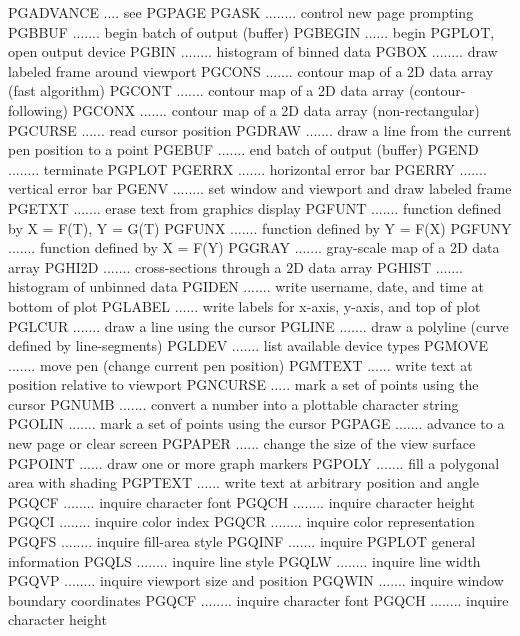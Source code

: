 {\eightpoint\begintt
PGADVANCE .... see PGPAGE
PGASK ........ control new page prompting
PGBBUF ....... begin batch of output (buffer)
PGBEGIN ...... begin PGPLOT, open output device
PGBIN ........ histogram of binned data
\endtt}
{\eightpoint\begintt
PGBOX ........ draw labeled frame around viewport
PGCONS ....... contour map of a 2D data array (fast algorithm)
PGCONT ....... contour map of a 2D data array (contour-following)
PGCONX ....... contour map of a 2D data array (non-rectangular)
PGCURSE ...... read cursor position
\endtt}
{\eightpoint\begintt
PGDRAW ....... draw a line from the current pen position to a point
PGEBUF ....... end batch of output (buffer)
PGEND ........ terminate PGPLOT
PGERRX ....... horizontal error bar
PGERRY ....... vertical error bar
\endtt}
{\eightpoint\begintt
PGENV ........ set window and viewport and draw labeled frame
PGETXT ....... erase text from graphics display
PGFUNT ....... function defined by X = F(T), Y = G(T)
PGFUNX ....... function defined by Y = F(X)
PGFUNY ....... function defined by X = F(Y)
\endtt}
{\eightpoint\begintt
PGGRAY ....... gray-scale map of a 2D data array
PGHI2D ....... cross-sections through a 2D data array
PGHIST ....... histogram of unbinned data
PGIDEN ....... write username, date, and time at bottom of plot
PGLABEL ...... write labels for x-axis, y-axis, and top of plot
\endtt}
{\eightpoint\begintt
PGLCUR ....... draw a line using the cursor
PGLINE ....... draw a polyline (curve defined by line-segments)
PGLDEV ....... list available device types
PGMOVE ....... move pen (change current pen position)
PGMTEXT ...... write text at position relative to viewport
\endtt}
{\eightpoint\begintt
PGNCURSE ..... mark a set of points using the cursor
PGNUMB ....... convert a number into a plottable character string
PGOLIN ....... mark a set of points using the cursor
PGPAGE ....... advance to a new page or clear screen
PGPAPER ...... change the size of the view surface
\endtt}
{\eightpoint\begintt
PGPOINT ...... draw one or more graph markers
PGPOLY ....... fill a polygonal area with shading
PGPTEXT ...... write text at arbitrary position and angle
PGQCF ........ inquire character font
PGQCH ........ inquire character height
\endtt}
{\eightpoint\begintt
PGQCI ........ inquire color index
PGQCR ........ inquire color representation
PGQFS ........ inquire fill-area style
PGQINF ....... inquire PGPLOT general information
PGQLS ........ inquire line style
\endtt}
{\eightpoint\begintt
PGQLW ........ inquire line width
PGQVP ........ inquire viewport size and position
PGQWIN ....... inquire window boundary coordinates
PGQCF ........ inquire character font
PGQCH ........ inquire character height
\endtt}
